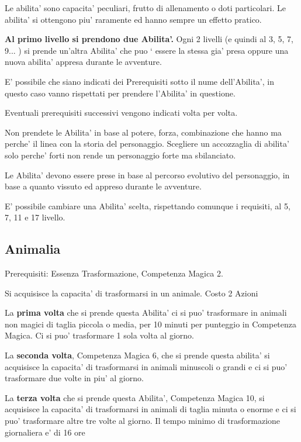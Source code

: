 \documentclass[a4paper,11pt,twoside,openany]{dndbook}
\begin{document}
Le abilita' sono capacita' peculiari, frutto di allenamento o doti particolari. Le abilita' si ottengono piu' raramente ed hanno sempre un effetto pratico.

\textbf{Al primo livello si prendono due Abilita'.} Ogni 2 livelli (e quindi al 3, 5, 7, 9... ) si prende un'altra Abilita' che puo ` essere la stessa gia' presa oppure una nuova abilita' appresa durante le avventure.

E' possibile che siano indicati dei Prerequisiti sotto il nume dell'Abilita', in questo caso vanno rispettati per prendere l'Abilita' in questione.

Eventuali prerequisiti successivi vengono indicati volta per volta.

Non prendete le Abilita' in base al potere, forza, combinazione che hanno ma perche' il linea con la storia del personaggio.
Scegliere un accozzaglia di abilita' solo perche' forti non rende un personaggio forte ma sbilanciato. 

\medskip
Le Abilita' devono essere prese in base al percorso evolutivo del personaggio, in base a quanto vissuto ed appreso durante le avventure.
\medskip

E' possibile cambiare una Abilita' scelta, rispettando comunque i requisiti, al 5, 7, 11 e 17 livello.

\subsection{Animalia}

Prerequisiti: Essenza Trasformazione, Competenza Magica 2.

Si acquisisce la capacita' di trasformarsi in un animale. Costo 2 Azioni

La \textbf{prima volta} che si prende questa Abilita' ci si puo' trasformare in animali non magici di taglia piccola o media, per 10 minuti per punteggio in Competenza Magica. Ci si puo' trasformare 1 sola volta al giorno.

La \textbf{seconda volta}, Competenza Magica 6, che si prende questa abilita' si acquisisce la capacita' di trasformarsi in animali minuscoli o grandi e ci si puo' trasformare due volte in piu' al giorno. 

La \textbf{terza volta} che si prende questa Abilita', Competenza Magica 10, si acquisisce la capacita' di trasformarsi in animali di taglia minuta o enorme e ci si puo' trasformare altre tre volte al giorno. Il tempo minimo di trasformazione giornaliera e' di 16 ore
\end{document}

